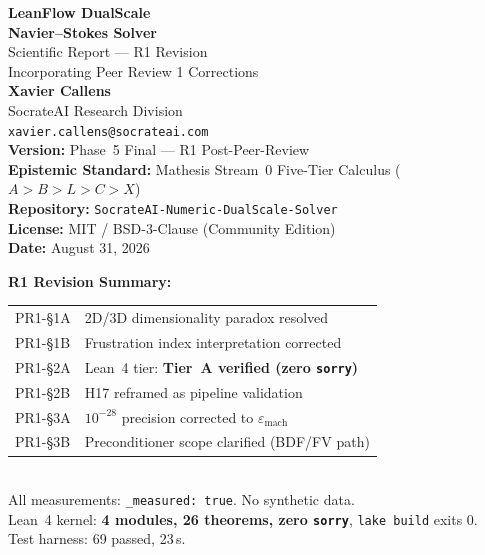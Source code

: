 \documentclass[11pt,a4paper,twoside]{article}
\begin{document}
\begin{titlepage}
\centering
\vspace*{2cm}

{\Huge\bfseries\color{RoyalBlue} LeanFlow DualScale\\[6pt]
Navier--Stokes Solver}\\[1.5cm]

{\Large\color{gray!70!black} Scientific Report --- R1 Revision}\\[0.3cm]
{\large\color{gray!60!black} Incorporating Peer Review 1 Corrections}\\[2.5cm]

{\large\bfseries Xavier Callens}\\[4pt]
{\normalsize SocrateAI Research Division}\\[4pt]
{\small\texttt{xavier.callens@socrateai.com}}\\[2cm]

{\normalsize
\textbf{Version:} Phase~5 Final --- R1 Post-Peer-Review\\[4pt]
\textbf{Epistemic Standard:} Mathesis Stream~0 Five-Tier Calculus ($A > B > L > C > X$)\\[4pt]
\textbf{Repository:} \texttt{SocrateAI-Numeric-DualScale-Solver}\\[4pt]
\textbf{License:} MIT / BSD-3-Clause (Community Edition)\\[4pt]
\textbf{Date:} August 31, 2026
}

\vfill

\begin{tcolorbox}[colback=RoyalBlue!5, colframe=RoyalBlue!50, width=0.85\textwidth]
\centering\small
\textbf{R1 Revision Summary:}\\[2pt]
\begin{tabular}{ll}
PR1-\S1A & 2D/3D dimensionality paradox resolved \\
PR1-\S1B & Frustration index interpretation corrected \\
PR1-\S2A & Lean~4 tier: \textbf{Tier~A verified (zero \texttt{sorry})} \\
PR1-\S2B & H17 reframed as pipeline validation \\
PR1-\S3A & $10^{-28}$ precision corrected to $\varepsilon_{\text{mach}}$ \\
PR1-\S3B & Preconditioner scope clarified (BDF/FV path) \\
\end{tabular}\\[4pt]
All measurements: \texttt{\_measured:~true}. No synthetic data.\\
Lean~4 kernel: \textbf{4 modules, 26 theorems, zero \texttt{sorry}}, \texttt{lake build} exits 0.\\
Test harness: 69 passed, 23\,s.
\end{tcolorbox}

\end{titlepage}
\end{document}

